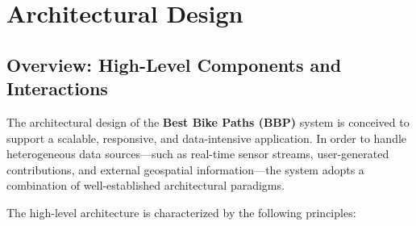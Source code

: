 \section{Architectural Design}

\subsection{Overview: High-Level Components and Interactions}
The architectural design of the \textbf{Best Bike Paths (BBP)} system is conceived to support a scalable, responsive, and data-intensive application. In order to handle heterogeneous data sources—such as real-time sensor streams, user-generated contributions, and external geospatial information—the system adopts a combination of well-established architectural paradigms.

The high-level architecture is characterized by the following principles:

